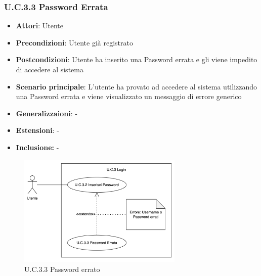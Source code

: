 \subsubsection{U.C.3.3 Password Errata}
\begin{itemize}
    \item \textbf{Attori}: Utente
    \item \textbf{Precondizioni}: Utente già registrato
    \item \textbf{Postcondizioni}: Utente ha inserito una Password errata e gli viene impedito di accedere al sistema
    \item \textbf{Scenario principale}: L'utente ha provato ad accedere al sistema utilizzando una Password errata e viene visualizzato un messaggio di errore generico
    \item \textbf{Generalizzaioni}: -
    \item \textbf{Estensioni}: -
    \item \textbf{Inclusione:} -
\end{itemize}
\begin{figure}[h!]
    \centering
    \includegraphics[width=0.7\textwidth]{img/UC3-3.png}
    \caption{U.C.3.3 Password errato}
\end{figure}
